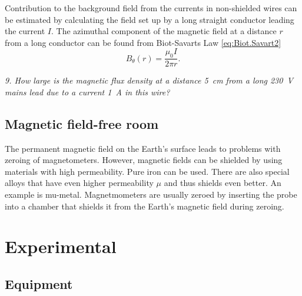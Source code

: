 \documentclass[../Elmag-labhefte-2020.tex]{subfiles}
\begin{document}
Contribution to the background field from the currents in non-shielded wires can be estimated by calculating the field set up by a long straight conductor leading the current $I$. The azimuthal component of the magnetic field at a distance $r$ from a long conductor can be found from  Biot-Savarts Law \eqref{eq:Biot.Savart2}
\begin{equation}
    B_\theta (r) = \frac{\mu_0 I}{2\pi r} .
\end{equation}

\emph{ 9. How large is the magnetic flux density at a distance \SI{5}{\cm} from a long \SI{230}{\volt} mains lead due to a current \SI{1}{\ampere} in this wire?}

\subsection{Magnetic field-free room \label{ch.mymetall}}

The permanent magnetic field on the Earth's surface leads to problems with zeroing of magnetometers. However, magnetic fields can be shielded by using materials with high permeability. Pure iron can be used. There are also special alloys that have even higher permeability $\mu$ and thus shields even better. An example is mu-metal. Magnetmometers are usually zeroed by inserting the probe into a chamber that shields it from the Earth's magnetic field during zeroing.


\section{Experimental \label{ch.magnetfelt.eksperimentelt}}

\subsection{Equipment}
\end{document}
